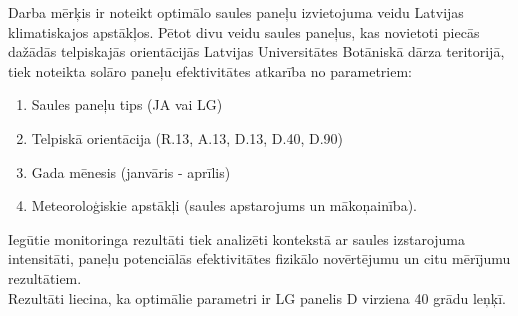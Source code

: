 Darba mērķis ir noteikt optimālo saules paneļu izvietojuma veidu Latvijas klimatiskajos apstākļos. 
Pētot divu veidu saules paneļus, kas novietoti piecās dažādās telpiskajās orientācijās Latvijas Universitātes Botāniskā dārza teritorijā, tiek noteikta solāro paneļu efektivitātes atkarība no parametriem:
\begin{enumerate}
\item Saules paneļu tips (JA vai LG)
\item Telpiskā orientācija (R.13, A.13, D.13, D.40, D.90)
\item Gada mēnesis (janvāris - aprīlis)
\item Meteoroloģiskie apstākļi (saules apstarojums un mākoņainība).
\end{enumerate}

Iegūtie monitoringa rezultāti tiek analizēti kontekstā ar saules izstarojuma intensitāti, paneļu potenciālās efektivitātes fizikālo novērtējumu un citu mērījumu rezultātiem.\\
Rezultāti liecina, ka optimālie parametri ir LG panelis D virziena 40 grādu leņķī.

